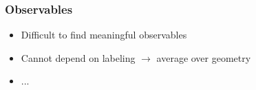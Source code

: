 \begin{frame}
    \frametitle{Observables}

    \begin{itemize}
        \item Difficult to find meaningful observables
        \item Cannot depend on labeling $\rightarrow$ average over geometry
        \item ...
    \end{itemize}

\end{frame}